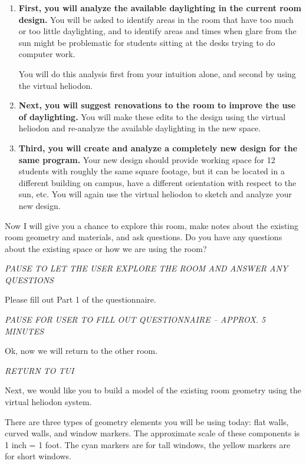 \documentclass[12pt]{article}
\begin{document}
\begin{enumerate}
\item {\bf First, you will analyze the available daylighting in the
  current room design.}  You will be asked to identify areas in the
  room that have too much or too little daylighting, and to identify
  areas and times when glare from the sun might be problematic for
  students sitting at the desks trying to do computer work.

   You will do this analysis first from your intuition alone, and
   second by using the virtual heliodon.

\item {\bf Next, you will suggest renovations to the room to improve
  the use of daylighting.}  You will make these edits to the design
  using the virtual heliodon and re-analyze the available daylighting
  in the new space.

\item {\bf Third, you will create and analyze a completely new design
  for the same program. } Your new design should provide working space
  for 12 students with roughly the same square footage, but it can be
  located in a different building on campus, have a different
  orientation with respect to the sun, etc.  You will again use the
  virtual heliodon to sketch and analyze your new design.

\end{enumerate}

Now I will give you a chance to explore this room, make notes about
the existing room geometry and materials, and ask questions.  Do you
have any questions about the existing space or how we are using the
room?

{\em PAUSE TO LET THE USER EXPLORE THE ROOM AND ANSWER ANY QUESTIONS }

Please fill out Part 1 of the questionnaire.

{\em PAUSE FOR USER TO FILL OUT QUESTIONNAIRE  --  APPROX. 5 MINUTES }

Ok, now we will return to the other room.

{\em RETURN TO TUI }

Next, we would like you to build a model of the existing room
geometry using the virtual heliodon system.  

There are three types of geometry elements you will be using today:
flat walls, curved walls, and window markers.  The approximate scale
of these components is 1 inch = 1 foot.  The cyan markers are for tall
windows, the yellow markers are for short windows.  
\end{document}

